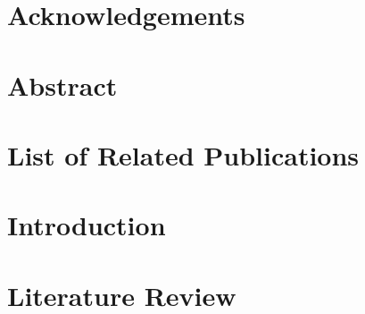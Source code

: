\documentclass[11pt]{book}
\renewcommand{\baselinestretch}{1.2}
\begin{document}


\newpage
\thispagestyle{empty}
\renewcommand{\thesisdedication}{{\large Copyright \copyright~Devesh Marwah, 2025\\}{\large All Rights Reserved\\}}
\thesisdedicationpage


\mastersthesis
%
%
\chapter*{}
\label{ch:par}


\chapter*{Acknowledgements}
\label{ch:Acknowlegements}



\chapter*{Abstract}
\label{ch:abstract}


\tableofcontents
\listoffigures
\let\cleardoublepage\clearpage
\listoftables
\printglossary[type=\acronymtype,title=Abbreviations,nonumberlist]

\chapter*{List of Related Publications}
\label{ch:relatedPubs}


\chapter{Introduction}
\label{ch:intro}

\chapter{Literature Review}
\label{ch:lit_review}

\end{document}
